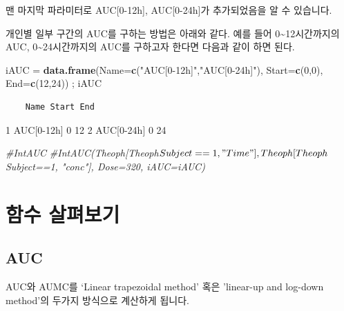 \documentclass[
  10pt,
]{krantz}
\makeatletter
\newenvironment{Shaded}{\begin{snugshade}}{\end{snugshade}}
\newcommand{\CommentTok}[1]{\textcolor[rgb]{0.56,0.35,0.01}{\textit{#1}}}
\newcommand{\DataTypeTok}[1]{\textcolor[rgb]{0.13,0.29,0.53}{#1}}
\newcommand{\DecValTok}[1]{\textcolor[rgb]{0.00,0.00,0.81}{#1}}
\newcommand{\KeywordTok}[1]{\textcolor[rgb]{0.13,0.29,0.53}{\textbf{#1}}}
\newcommand{\NormalTok}[1]{#1}
\newcommand{\OperatorTok}[1]{\textcolor[rgb]{0.81,0.36,0.00}{\textbf{#1}}}
\newcommand{\StringTok}[1]{\textcolor[rgb]{0.31,0.60,0.02}{#1}}
\newenvironment{kframe}{%
\medskip{}
\setlength{\fboxsep}{.8em}
 \def\at@end@of@kframe{}%
 \ifinner\ifhmode%
  \def\at@end@of@kframe{\end{minipage}}%
  \begin{minipage}{\columnwidth}%
 \fi\fi%
 \def\FrameCommand##1{\hskip\@totalleftmargin \hskip-\fboxsep
 \colorbox{shadecolor}{##1}\hskip-\fboxsep
     \hskip-\linewidth \hskip-\@totalleftmargin \hskip\columnwidth}%
 \MakeFramed {\advance\hsize-\width
   \@totalleftmargin\z@ \linewidth\hsize
   \@setminipage}}%
 {\par\unskip\endMakeFramed%
 \at@end@of@kframe}
\renewenvironment{Shaded}{\begin{kframe}}{\end{kframe}}
\makeatother
\begin{document}
맨 마지막 파라미터로 AUC{[}0-12h{]}, AUC{[}0-24h{]}가 추가되었음을 알 수 있습니다.

개인별 일부 구간의 AUC를 구하는 방법은 아래와 같다.
예를 들어 0\textasciitilde12시간까지의 AUC, 0\textasciitilde24시간까지의 AUC를 구하고자 한다면 다음과 같이 하면 된다.

\begin{Shaded}
\begin{Highlighting}[]
\NormalTok{iAUC =}\StringTok{ }\KeywordTok{data.frame}\NormalTok{(}\DataTypeTok{Name=}\KeywordTok{c}\NormalTok{(}\StringTok{"AUC[0{-}12h]"}\NormalTok{,}\StringTok{"AUC[0{-}24h]"}\NormalTok{), }\DataTypeTok{Start=}\KeywordTok{c}\NormalTok{(}\DecValTok{0}\NormalTok{,}\DecValTok{0}\NormalTok{), }\DataTypeTok{End=}\KeywordTok{c}\NormalTok{(}\DecValTok{12}\NormalTok{,}\DecValTok{24}\NormalTok{)) ; iAUC}
\end{Highlighting}
\end{Shaded}

\begin{verbatim}
    Name Start End
\end{verbatim}

1 AUC{[}0-12h{]} 0 12
2 AUC{[}0-24h{]} 0 24

\begin{Shaded}
\begin{Highlighting}[]
\CommentTok{\#IntAUC}
\CommentTok{\#IntAUC(Theoph[Theoph$Subject==1,"Time"], Theoph[Theoph$Subject==1, "conc"], Dose=320, iAUC=iAUC)}
\end{Highlighting}
\end{Shaded}

\hypertarget{functions}{%
\section{함수 살펴보기}\label{functions}}

\hypertarget{auc}{%
\subsection{AUC}\label{auc}}

AUC와 AUMC를 `Linear trapezoidal method' 혹은 'linear-up and log-down method'의 두가지 방식으로 계산하게 됩니다.

\begin{Shaded}
\end{Shaded}
\end{document}
